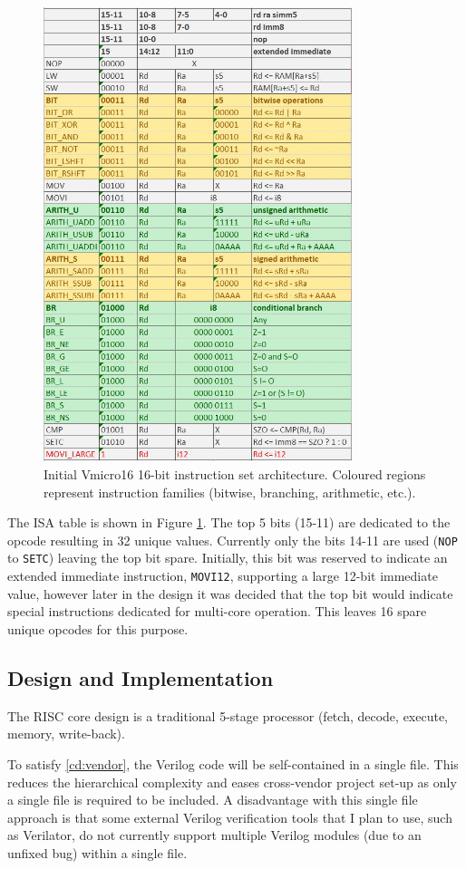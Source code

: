\documentclass[11pt,a4paper]{report}
\begin{document}
{\begin{figure}[h]
\centering 
\includegraphics[width=9cm]{../img/isa}
\caption{Initial Vmicro16 16-bit instruction set architecture. Coloured regions represent instruction families (bitwise, branching, arithmetic, etc.).}
\label{fig:isa}
\end{figure}
The ISA table is shown in Figure \ref{fig:isa}. The top 5 bits (15-11) are dedicated to the opcode resulting in 32 unique values. Currently only the bits 14-11 are used (\verb|NOP| to \verb|SETC|) leaving the top bit spare. Initially, this bit was reserved to indicate an extended immediate instruction, \verb|MOVI12|, supporting a large 12-bit immediate value, however later in the design it was decided that the top bit would indicate special instructions dedicated for multi-core operation. This leaves 16 spare unique opcodes for this purpose.


\newpage
\subsection{Design and Implementation}
The RISC core design is a traditional 5-stage processor (fetch, decode, execute, memory, write-back).

To satisfy \ref{cd:vendor}, the Verilog code will be self-contained in a single file. This reduces the hierarchical complexity and eases cross-vendor project set-up as only a single file is required to be included. 
A disadvantage with this single file approach is that some external Verilog verification tools that I plan to use, such as Verilator, do not currently support multiple Verilog modules (due to an unfixed bug) within a single file. 

}
\end{document}
